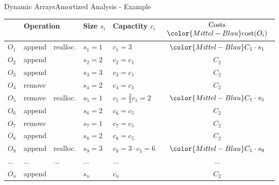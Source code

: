 \begin{frame}{Dynamic Arrays}{Amortized Analysis - Example}
  \vspace*{-1.0em}
  \begin{table}[!h]
    \label{tab:amortized_analysis_introduction}%
    \begin{tabular}{|l|l|l|l|l|c|}
      \bottomrule
      \multicolumn{3}{|c|}{Operation} &
      Size {\color{Mittel-Blau}$s_i$} &
      Capactity {\color{Mittel-Blau}$c_i$} &
      $\begin{array}{c}
        \text{Costs}\\
        {\color{Mittel-Blau}\mathrm{cost}(O_i)}
      \end{array}$\\
      \toprule
      $O_1$ & append & {\color{Mittel-Blau}realloc.} &
      $s_1 = 1$ & {\color{Mittel-Blau}$c_1 = 3$} &
      ${\color{Mittel-Blau}C_1 \cdot s_1}$\\
      $O_2$ & append & {} &
      $s_2 = 2$ & $c_2 = c_1$ & $C_2$\\
      $O_3$ & append & {} &
      $s_3 = 3$ & $c_3 = c_1$ & $C_2$\\
      $O_4$ & remove & {} &
      $s_4 = 2$ & $c_4 = c_1$ & $C_2$\\
      \midrule
      $O_5$ & remove & {\color{Mittel-Blau}realloc.} &
      $s_5 = 1$ & {\color{Mittel-Blau}$c_5 = \frac{2}{3} c_1 = 2$} &
      ${\color{Mittel-Blau}C_1 \cdot s_5}$\\
      $O_6$ & append & {} &
      $s_6 = 2$ & $c_6 = c_5$ & $C_2$\\
      $O_7$ & remove & {} &
      $s_7 = 1$ & $c_7 = c_5$ & $C_2$\\
      $O_8$ & append & {} &
      $s_8 = 2$ & $c_8 = c_5$ & $C_2$\\
      \midrule
      $O_9$ & append & {\color{Mittel-Blau}realloc.} &
      $s_9 = 3$ & {\color{Mittel-Blau}$c_9 = 3 \cdot c_5 = 6$} &
      ${\color{Mittel-Blau}C_1 \cdot s_9}$\\
      $\dots$ & $\dots$ & $\dots$ & $\dots$ & $\dots$ & $\dots$\\
      $O_n$ & append & {} &
      $s_n$ & $c_n$ & $C_2$\\
      \bottomrule
    \end{tabular}
  \end{table}
\end{frame}


